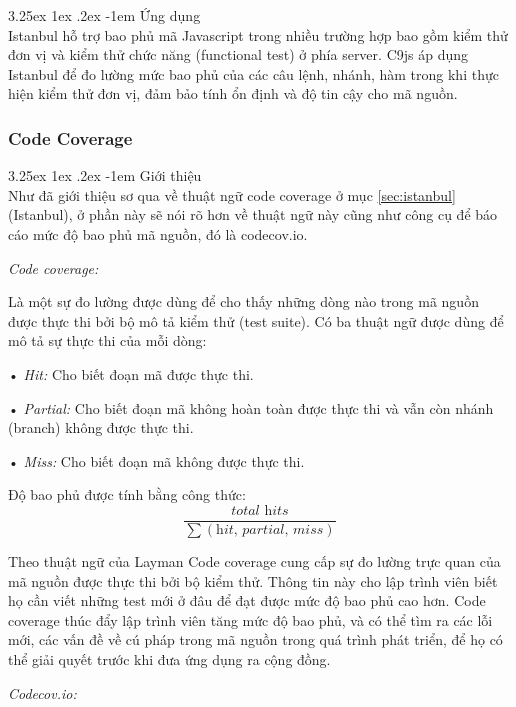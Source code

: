 \documentclass[12pt,a4paper]{article}
\makeatletter
\newcommand{\myparagraph}[1]{\paragraph{#1}\mbox{}\\} %
\renewcommand\paragraph{\@startsection{paragraph}{5}{\z@}%
  {3.25ex \@plus1ex \@minus.2ex}%
  {-1em}%
  {\normalfont\normalsize\bfseries}}
\makeatother
\begin{document}
\myparagraph{Ứng dụng}
Istanbul hỗ trợ bao phủ mã Javascript trong nhiều trường hợp bao gồm kiểm thử đơn vị và kiểm thử chức năng (functional test) ở phía server. C9js áp dụng Istanbul để đo lường mức bao phủ của các câu lệnh, nhánh, hàm trong khi thực hiện kiểm thử đơn vị, đảm bảo tính ổn định và độ tin cậy cho mã nguồn. 



\subsubsection{Code Coverage}
\myparagraph{Giới thiệu}
Như đã giới thiệu sơ qua về thuật ngữ code coverage ở mục \ref{sec:istanbul} (Istanbul), ở phần này sẽ nói rõ hơn về thuật ngữ này cũng như công cụ để báo cáo mức độ bao phủ mã nguồn, đó là codecov.io.

\textit{Code coverage:}

Là một sự đo lường được dùng để cho thấy những dòng nào trong mã nguồn được thực thi bởi bộ mô tả kiểm thử (test suite). Có ba thuật ngữ được dùng để mô tả sự thực thi của mỗi dòng:

\begin{list}{}{}
\item[•] \emph{Hit:} Cho biết đoạn mã được thực thi.
\item[•] \emph{Partial:} Cho biết đoạn mã không hoàn toàn được thực thi và vẫn còn nhánh (branch) không được thực thi.
\item[•] \emph{Miss:} Cho biết đoạn mã không được thực thi.
\end{list}

Độ bao phủ được tính bằng công thức:
\[
    \frac{\textit{total hits}}{\sum{(\textit{hit, partial, miss})}}
\]

Theo thuật ngữ của Layman\citep{codecov_wiki} Code coverage cung cấp sự đo lường trực quan của mã nguồn được thực thi bởi bộ kiểm thử. Thông tin này cho lập trình viên biết họ cần viết những test mới ở đâu để đạt được mức độ bao phủ cao hơn. Code coverage thúc đẩy lập trình viên tăng mức độ bao phủ, và có thể tìm ra các lỗi mới, các vấn đề về cú pháp trong mã nguồn trong quá trình phát triển, để họ có thể giải quyết trước khi đưa ứng dụng ra cộng đồng.

\textit{Codecov.io:}
\end{document}
